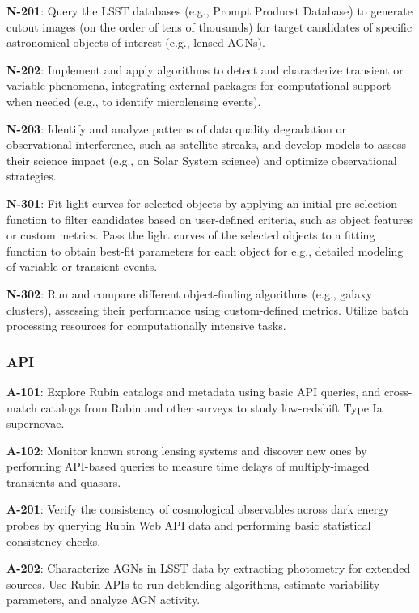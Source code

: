 \textbf{N-201}: Query the LSST databases (e.g., Prompt Producst Database) to generate cutout images (on the order of tens of thousands) for target candidates of specific astronomical objects of interest (e.g., lensed AGNs).

\textbf{N-202}: Implement and apply algorithms to detect and characterize transient or variable phenomena, integrating external packages for computational support when needed (e.g., to identify microlensing events).

\textbf{N-203}: Identify and analyze patterns of data quality degradation or observational interference, such as satellite streaks, and develop models to assess their science impact (e.g., on Solar System science) and optimize observational strategies.

\textbf{N-301}: Fit light curves for selected objects by applying an initial pre-selection function to filter candidates based on user-defined criteria, such as object features or custom metrics.
Pass the light curves of the selected objects to a fitting function to obtain best-fit parameters for each object for e.g.,  detailed modeling of variable or transient events. 

\textbf{N-302}: Run and compare different object-finding algorithms (e.g., galaxy clusters), assessing their performance using custom-defined metrics. Utilize batch processing resources for computationally intensive tasks.

\subsubsection{API}

\textbf{A-101}: Explore Rubin catalogs and metadata using basic API queries, and cross-match catalogs from Rubin and other surveys to study low-redshift Type Ia supernovae.

\textbf{A-102}: Monitor known strong lensing systems and discover new ones by performing API-based queries to measure time delays of multiply-imaged transients and quasars.

\textbf{A-201}: Verify the consistency of cosmological observables across dark energy probes by querying Rubin Web API data and performing basic statistical consistency checks.

\textbf{A-202}: Characterize AGNs in LSST data by extracting photometry for extended sources. Use Rubin APIs to run deblending algorithms, estimate variability parameters, and analyze AGN activity.


